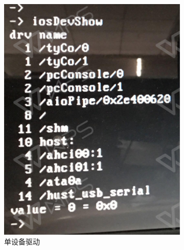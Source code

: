 \begin{figure}[h]
\centering
  \begin{subfigure}[b]{0.4\textwidth}
  \includegraphics[width=\textwidth]{./graphics/iosDevShowS.pdf}
  \caption{单设备驱动}
  \end{subfigure}
  ~
  \begin{subfigure}[b]{0.4\textwidth}

\end{subfigure}
\end{figure}
